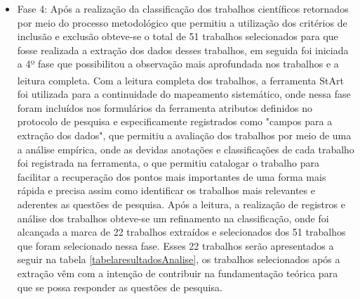 \begin{itemize}
\item Fase 4: Após a realização da classificação dos trabalhos científicos retornados por meio do processo metodológico que permitiu a utilização dos critérios de inclusão e exclusão obteve-se o total de 51 trabalhos selecionados para que fosse realizada a extração dos dados desses trabalhos, em seguida foi iniciada a 4º fase que possibilitou a observação mais aprofundada nos trabalhos e a leitura completa. Com a leitura completa dos trabalhos, a ferramenta \acrshort{StArt}\textsuperscript{\textregistered} foi utilizada para a continuidade do mapeamento sistemático, onde nessa fase foram incluídos nos formulários da ferramenta atributos definidos no protocolo de pesquisa e especificamente registrados como "campos para a extração dos dados", que permitiu a avaliação dos trabalhos por meio de uma a análise empírica, onde as devidas anotações e classificações de cada trabalho foi registrada na ferramenta, o que permitiu catalogar o trabalho para facilitar a recuperação dos pontos mais importantes de uma forma mais rápida e precisa assim como identificar os trabalhos mais relevantes e aderentes as questões de pesquisa. Após a leitura, a realização de registros e análise dos trabalhos obteve-se um refinamento na classificação, onde foi alcançada a marca de 22 trabalhos extraídos e selecionados dos 51 trabalhos que foram selecionado nessa fase. Esses 22 trabalhos serão apresentados a seguir na tabela \ref{tabelaresultadosAnalise}, os trabalhos selecionados após a extração vêm com a intenção de contribuir na fundamentação teórica para que se possa responder as questões de pesquisa. 

\end{itemize}


